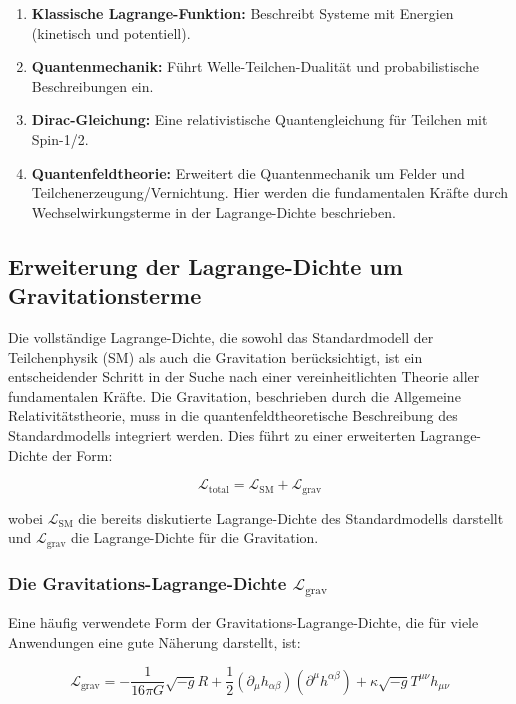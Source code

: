 \documentclass{article}
\begin{document}
	\begin{enumerate}
		\item \textbf{Klassische Lagrange-Funktion:} Beschreibt Systeme mit Energien (kinetisch und potentiell).
		\item \textbf{Quantenmechanik:} Führt Welle-Teilchen-Dualität und probabilistische Beschreibungen ein.
		\item \textbf{Dirac-Gleichung:} Eine relativistische Quantengleichung für Teilchen mit Spin-1/2.
		\item \textbf{Quantenfeldtheorie:} Erweitert die Quantenmechanik um Felder und Teilchenerzeugung/Vernichtung. Hier werden die fundamentalen Kräfte durch Wechselwirkungsterme in der Lagrange-Dichte beschrieben.
	\end{enumerate}
	
\subsection{Erweiterung der Lagrange-Dichte um Gravitationsterme}

Die vollständige Lagrange-Dichte, die sowohl das Standardmodell der Teilchenphysik (SM) als auch die Gravitation berücksichtigt, ist ein entscheidender Schritt in der Suche nach einer vereinheitlichten Theorie aller fundamentalen Kräfte.  Die Gravitation, beschrieben durch die Allgemeine Relativitätstheorie, muss in die quantenfeldtheoretische Beschreibung des Standardmodells integriert werden.  Dies führt zu einer erweiterten Lagrange-Dichte der Form:

\begin{equation}
	\mathcal{L}_\text{total} = \mathcal{L}_\text{SM} + \mathcal{L}_\text{grav}
\end{equation}

wobei $\mathcal{L}_\text{SM}$ die bereits diskutierte Lagrange-Dichte des Standardmodells darstellt und $\mathcal{L}_\text{grav}$ die Lagrange-Dichte für die Gravitation.

\subsubsection{Die Gravitations-Lagrange-Dichte $\mathcal{L}_\text{grav}$}

Eine häufig verwendete Form der Gravitations-Lagrange-Dichte, die für viele Anwendungen eine gute Näherung darstellt, ist:

\begin{equation}
	\mathcal{L}_\text{grav} = -\frac{1}{16\pi G} \sqrt{-g}R + \frac{1}{2}(\partial_\mu h_{\alpha\beta})(\partial^\mu h^{\alpha\beta}) + \kappa \sqrt{-g}T^{\mu\nu}h_{\mu\nu}
\end{equation}
\end{document}
